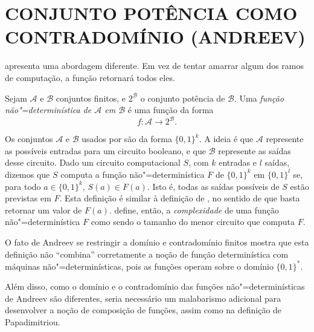 \section{CONJUNTO POTÊNCIA COMO CONTRADOMÍNIO (ANDREEV)}

apresenta uma abordagem diferente.
Em vez de tentar amarrar algum dos ramos de computação,
a função retornará todos eles.

\begin{definition}
    Sejam $\mathcal A$ e $\mathcal B$ conjuntos finitos,
    e $2^\mathcal B$ o conjunto potência de $\mathcal B$.
    Uma \emph{função não"=determinística de $\mathcal A$ em $\mathcal B$}
    é uma função da forma
    \begin{equation*}
        f : \mathcal A \to 2^\mathcal B.
    \end{equation*}
    \cite[p.~3]{Andreev1994}
\end{definition}

Os conjuntos $\mathcal A$ e $\mathcal B$ usados por 
são da forma $\{0, 1\}^k$.
A ideia é que $\mathcal A$ represente as possíveis entradas para um circuito booleano,
e que $\mathcal B$ represente as saídas desse circuito.
Dado um circuito computacional $S$,
com $k$ entradas e $l$ saídas,
dizemos que $S$ computa a função não"=determinística $F$ de $\{0, 1\}^k$ em $\{0, 1\}^l$
se,
para todo $a \in \{0, 1\}^k$,
$S(a) \in F(a)$.
Isto é,
todas as saídas possíveis de $S$ estão previstas em $F$.
Esta definição é similar à definição de ,
no sentido de que basta retornar um valor de $F(a)$.
define, então,
a \emph{complexidade} de uma função não"=determinística $F$
como sendo o tamanho do menor circuito que computa $F$.

O fato de Andreev se restringir a domínio e contradomínio finitos
mostra que esta definição não ``combina'' corretamente
a noção de função determinística com máquinas não"=determinísticas,
pois as funções operam sobre o domínio $\{0, 1\}^*$.

Além disso,
como o domínio e o contradomínio das funções não"=determinísticas de Andreev
são diferentes,
seria necessário um malabarismo adicional
para desenvolver a noção de composição de funções,
assim como na definição de Papadimitriou.
